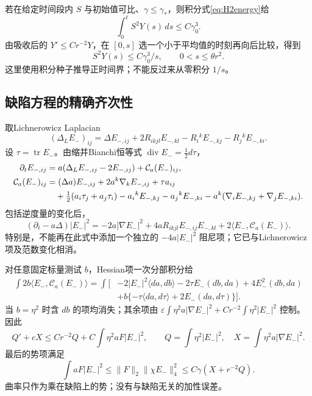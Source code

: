 \documentclass[UTF8,a4paper,11pt,fontset=fandol]{ctexart}
\numberwithin{equation}{section}
\theoremstyle{definition}
\newcommand{\tr}{\operatorname{tr}}
\begin{document}
若在给定时间段内 $S$ 与初始值可比、$\gamma\le\gamma_*$，则积分式\eqref{eq:H2energy}给
\[
\int_0^tS^2Y(s)\,ds\le C\gamma_0^3.
\]
由吸收后的 $Y'\le Cr^{-2}Y$，在 $[0,s]$ 选一个小于平均值的时刻再向后比较，得到
\begin{equation}\label{eq:positive-seed}
S^2Y(s)\le C\gamma_0^3/s,\qquad 0<s\le\theta r^2.
\end{equation}
这里使用积分种子推导正时间界；不能反过来从零积分 $1/s$。

\subsection{缺陷方程的精确齐次性}
取Lichnerowicz Laplacian
\[
(\Delta_LE_-)_{ij}=\Delta E_{-,ij}
+2R_{ikjl}E_{-,kl}-R_i{}^kE_{-,kj}-R_j{}^kE_{-,ki}.
\]
设 $\tau=\tr E_-$。由缩并Bianchi恒等式 $\operatorname{div}E_-=\tfrac12d\tau$，
\begin{align}
\partial_tE_{-,ij}&=a(\Delta_LE_{-,ij}-2E_{-,ij})+\mathcal C_a(E_-)_{ij},\\
\mathcal C_a(E_-)_{ij}
&=(\Delta a)E_{-,ij}+2a^k\nabla_kE_{-,ij}+\tau a_{ij}\notag\\
&\quad+\tfrac12(a_i\tau_j+a_j\tau_i)
-a_i{}^kE_{-,kj}-a_j{}^kE_{-,ki}
-a^k(\nabla_iE_{-,kj}+\nabla_jE_{-,ki}).\notag
\end{align}
包括逆度量的变化后，
\begin{equation}\label{eq:Enorm}
(\partial_t-a\Delta)|E_-|^2
=-2a|\nabla E_-|^2+4aR_{ikjl}E_{-,ij}E_{-,kl}
+2\langle E_-,\mathcal C_a(E_-)\rangle .
\end{equation}
特别是，不能再在此式中添加一个独立的 $-4a|E_-|^2$ 阻尼项；它已与Lichnerowicz项及范数变化相消。

对任意固定标量测试 $b$，Hessian项一次分部积分给
\begin{align*}
\int2b\langle E_-,\mathcal C_a(E_-)\rangle
=\int\bigl[&
-2|E_-|^2\langle da,db\rangle
-2\tau E_-(db,da)+4E_-^2(db,da)\\
&+b\{-\tau\langle da,d\tau\rangle+2E_-(da,d\tau)\}\bigr].
\end{align*}
当 $b=\eta^2$ 时含 $db$ 的项均消失；其余项由
$\varepsilon\int\eta^2a|\nabla E_-|^2+Cr^{-2}\int\eta^2|E_-|^2$
控制。因此
\begin{equation}\label{eq:Qenergy}
Q'+cX\le Cr^{-2}Q+C\int\eta^2aF|E_-|^2,\qquad
Q=\int\eta^2|E_-|^2,\quad X=\int\eta^2a|\nabla E_-|^2.
\end{equation}
最后的势项满足
\[
\int aF|E_-|^2
\le\|F\|_2\|\chi E_-\|_4^2
\le C\gamma(X+r^{-2}Q).
\]
曲率只作为乘在缺陷上的势；没有与缺陷无关的加性误差。
\end{document}
